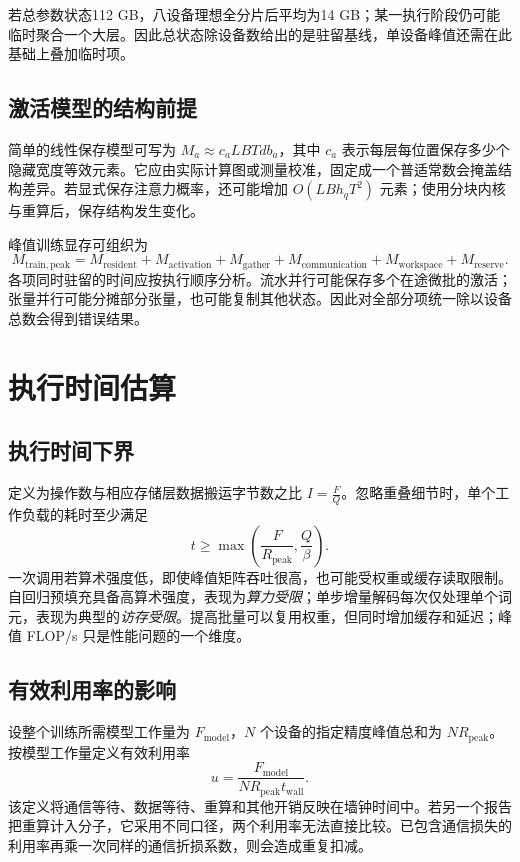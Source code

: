 \documentclass[../textbook.tex]{subfiles}
\begin{document}
若总参数状态112 GB，八设备理想全分片后平均为14 GB；某一执行阶段仍可能临时聚合一个大层。因此总状态除设备数给出的是驻留基线，单设备峰值还需在此基础上叠加临时项。

\subsection{激活模型的结构前提}
简单的线性保存模型可写为 $M_a\approx c_aLBTdb_a$，其中 $c_a$ 表示每层每位置保存多少个隐藏宽度等效元素。它应由实际计算图或测量校准，固定成一个普适常数会掩盖结构差异。若显式保存注意力概率，还可能增加 $O(LBh_qT^2)$ 元素；使用分块内核与重算后，保存结构发生变化。

峰值训练显存可组织为
\begin{equation}
 M_{\mathrm{train,peak}}=M_{\mathrm{resident}}+M_{\mathrm{activation}}
 +M_{\mathrm{gather}}+M_{\mathrm{communication}}+M_{\mathrm{workspace}}+M_{\mathrm{reserve}}.
\end{equation}
各项同时驻留的时间应按执行顺序分析。流水并行可能保存多个在途微批的激活；张量并行可能分摊部分张量，也可能复制其他状态。因此对全部分项统一除以设备总数会得到错误结果。

\section{执行时间估算}

\subsection{执行时间下界}
定义为操作数与相应存储层数据搬运字节数之比 $I=\frac{F}{Q}$。忽略重叠细节时，单个工作负载的耗时至少满足
\begin{equation}
 t\ge\max(\frac{F}{R_{\mathrm{peak}}},\frac{Q}{\beta}).
\end{equation}
一次调用若算术强度低，即使峰值矩阵吞吐很高，也可能受权重或缓存读取限制。自回归预填充具备高算术强度，表现为\emph{算力受限}；单步增量解码每次仅处理单个词元，表现为典型的\emph{访存受限}。提高批量可以复用权重，但同时增加缓存和延迟；峰值 FLOP/s 只是性能问题的一个维度。

\subsection{有效利用率的影响}
设整个训练所需模型工作量为 $F_{\mathrm{model}}$，$N$ 个设备的指定精度峰值总和为 $NR_{\mathrm{peak}}$。按模型工作量定义有效利用率
\begin{equation}
 u=\frac{F_{\mathrm{model}}}{N R_{\mathrm{peak}}t_{\mathrm{wall}}}.
\end{equation}
该定义将通信等待、数据等待、重算和其他开销反映在墙钟时间中。若另一个报告把重算计入分子，它采用不同口径，两个利用率无法直接比较。已包含通信损失的利用率再乘一次同样的通信折损系数，则会造成重复扣减。
\end{document}
